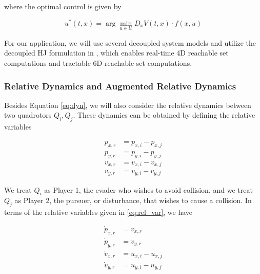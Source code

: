 \noindent where the optimal control is given by

\begin{equation} \label{eq:HJB_ctrl_syn}
u^*(t,x) = \arg \min_{u\in\mathcal{U}} D_x V(t,x) \cdot f(x,u)
\end{equation}

For our application, we will use several decoupled system models and utilize the decoupled HJ formulation in \cite{Chen15}, which enables real-time 4D reachable set computations and tractable 6D reachable set computations.

\subsubsection{Relative Dynamics and Augmented Relative Dynamics}
Besides Equation \eqref{eq:dyn}, we will also consider the relative dynamics between two quadrotors $Q_i,Q_j$. These dynamics can be obtained by defining the relative variables

\begin{equation} \label{eq:rel_var}
\begin{aligned}
p_{x,r} &= p_{x,i} - p_{x,j} \\
p_{y,r} &= p_{y,i} - p_{y,j}\\
v_{x,r} &= v_{x,i} - v_{x,j}\\
v_{y,r} &= v_{y,i} - v_{y,j}
\end{aligned}
\end{equation}

We treat $Q_i$ as Player 1, the evader who wishes to avoid collision, and we treat $Q_j$ as Player 2, the pursuer, or disturbance, that wishes to cause a collision. In terms of the relative variables given in \eqref{eq:rel_var}, we have 

\begin{equation} \label{eq:rel_dyn}
\begin{aligned}
\dot{p}_{x,r} &= v_{x,r} \\
\dot{p}_{y,r} &= v_{y,r} \\
\dot{v}_{x,r} &= u_{x,i} - u_{x,j} \\
\dot{v}_{y,r} &= u_{y,i} - u_{y,j}
\end{aligned}
\end{equation}


